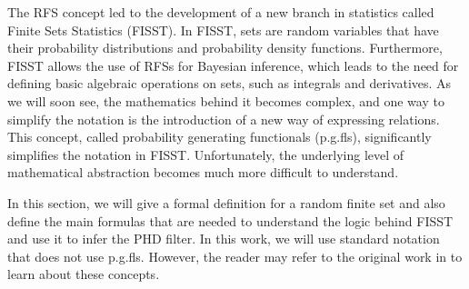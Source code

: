 The RFS concept led to the development of a new branch in statistics called Finite Sets Statistics (FISST). In FISST, sets are random variables that have their probability distributions and probability density functions. Furthermore, FISST allows the use of RFSs for Bayesian inference, which leads to the need for defining basic algebraic operations on sets, such as integrals and derivatives. As we will soon see, the mathematics behind it becomes complex, and one way to simplify the notation is the introduction of a new way of expressing relations. This concept, called probability generating functionals (p.g.fls), significantly simplifies the notation in FISST. Unfortunately, the underlying level of mathematical abstraction becomes much more difficult to understand.

In this section, we will give a formal definition for a random finite set and also define the main formulas that are needed to understand the logic behind FISST and use it to infer the PHD filter. In this work, we will use standard notation that does not use p.g.fls. However, the reader may refer to the original work in \cite{mahlerMultitargetBayesFiltering2003} to learn about these concepts.
